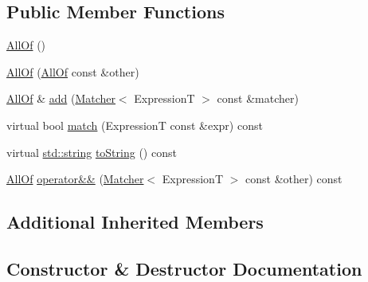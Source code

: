 \subsection*{Public Member Functions}
\begin{DoxyCompactItemize}
\item 
\hyperlink{class_catch_1_1_matchers_1_1_impl_1_1_generic_1_1_all_of_a9dfcc2f0549114f3b50cc65a2e10c996}{All\+Of} ()
\item 
\hyperlink{class_catch_1_1_matchers_1_1_impl_1_1_generic_1_1_all_of_a31f7c5e570e79bdf64064ee87c331a59}{All\+Of} (\hyperlink{class_catch_1_1_matchers_1_1_impl_1_1_generic_1_1_all_of}{All\+Of} const \&other)
\item 
\hyperlink{class_catch_1_1_matchers_1_1_impl_1_1_generic_1_1_all_of}{All\+Of} \& \hyperlink{class_catch_1_1_matchers_1_1_impl_1_1_generic_1_1_all_of_a8c5cd1e494ab697076da418ee72ac297}{add} (\hyperlink{struct_catch_1_1_matchers_1_1_impl_1_1_matcher}{Matcher}$<$ ExpressionT $>$ const \&matcher)
\item 
virtual bool \hyperlink{class_catch_1_1_matchers_1_1_impl_1_1_generic_1_1_all_of_a04534d0ac9e089f4500c3c19054f11ce}{match} (ExpressionT const \&expr) const 
\item 
virtual \hyperlink{_s_d_l__opengl__glext_8h_ae84541b4f3d8e1ea24ec0f466a8c568b}{std\+::string} \hyperlink{class_catch_1_1_matchers_1_1_impl_1_1_generic_1_1_all_of_a9febc1e67acbeff62a32bcbfdc0c8fab}{to\+String} () const 
\item 
\hyperlink{class_catch_1_1_matchers_1_1_impl_1_1_generic_1_1_all_of}{All\+Of} \hyperlink{class_catch_1_1_matchers_1_1_impl_1_1_generic_1_1_all_of_ac2b4045ae39746852a0f603715ba1387}{operator\&\&} (\hyperlink{struct_catch_1_1_matchers_1_1_impl_1_1_matcher}{Matcher}$<$ ExpressionT $>$ const \&other) const 
\end{DoxyCompactItemize}
\subsection*{Additional Inherited Members}


\subsection{Constructor \& Destructor Documentation}
